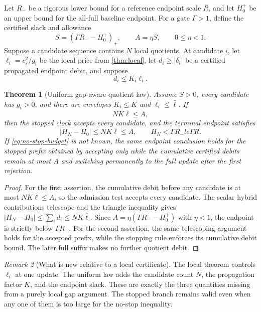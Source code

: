 \documentclass[11pt]{article}
\newtheorem{theorem}{Theorem}[section]
\theoremstyle{definition}
\theoremstyle{remark}
\newtheorem{remark}[theorem]{Remark}
\begin{document}
Let $R_-$ be a rigorous lower bound for a reference endpoint scale $R$, and
let $H_0^+$ be an upper bound for the all-full baseline endpoint.  For a gate
$\Gamma>1$, define the certified slack and allowance
\begin{equation}
 S=(\Gamma R_--H_0^+)_+,
 \qquad A=\eta S,
 \qquad 0\le\eta<1.
 \label{eq:slack}
\end{equation}
Suppose a candidate sequence contains $N$ local quotients.  At candidate $i$,
let $\ell_i=c_i^2/g_i$ be the local price from \cref{thm:local}, let
$d_i\ge|\delta_i|$ be a certified propagated endpoint debit, and suppose
\begin{equation}
 d_i\le K_i\ell_i.
 \label{eq:propagated-price}
\end{equation}

\begin{theorem}[Uniform gap-aware quotient law]
 \label{thm:uniform}
 Assume $S>0$, every candidate has $g_i>0$, and there are envelopes
 $K_i\le K$ and $\ell_i\le\bar\ell$.  If
 \begin{equation}
 N K\bar\ell\le A,
 \label{eq:no-stop-budget}
 \end{equation}
 then the stopped clock accepts every candidate, and the terminal endpoint
 satisfies
 \begin{equation}
 |H_N-H_0|\le NK\bar\ell\le A,
 \qquad
 H_N<\Gamma R_-le\Gamma R.
 \label{eq:no-stop-conclusion}
 \end{equation}
 If \eqref{eq:no-stop-budget} is not known, the same endpoint conclusion
 holds for the stopped prefix obtained by accepting only while the cumulative
 certified debits remain at most $A$ and switching permanently to the full
 update after the first rejection.
\end{theorem}

\begin{proof}
 For the first assertion, the cumulative debit before any candidate is at
 most $NK\bar\ell\le A$, so the admission test accepts every candidate.
 The scalar hybrid contributions telescope and the triangle inequality gives
 $|H_N-H_0|\le\sum_i d_i\le NK\bar\ell$.  Since
 $A=\eta(\Gamma R_--H_0^+)$ with $\eta<1$, the endpoint is strictly below
 $\Gamma R_-$.  For the second assertion, the same telescoping argument holds
 for the accepted prefix, while the stopping rule enforces its cumulative
 debit bound.  The later full suffix makes no further quotient debit.
\end{proof}

\begin{remark}[What is new relative to a local certificate]
 The local theorem controls $\ell_i$ at one update.  The uniform law adds the
 candidate count $N$, the propagation factor $K$, and the endpoint slack.
 These are exactly the three quantities missing from a purely local gap
 argument.  The stopped branch remains valid even when any one of them is too
 large for the no-stop inequality.
\end{remark}
\end{document}
